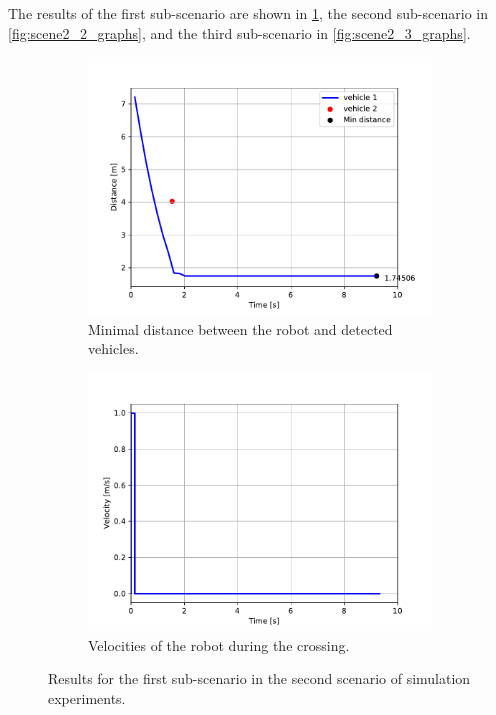             The results of the first sub-scenario are shown in \ref{fig:scene2_1_graphs}, the second sub-scenario in \ref{fig:scene2_2_graphs}, and the third sub-scenario in \ref{fig:scene2_3_graphs}.
            \begin{figure}[H]
                \centering
                \begin{subfigure}{0.49\linewidth}
                    \centering
                    \includegraphics[trim={24 8 35 41}, clip, width=\linewidth]{images/simulations/scene2_1_dist.pdf}
                    \caption{Minimal distance between the robot and detected vehicles.}
                \end{subfigure}
                \begin{subfigure}{0.49\linewidth}
                    \centering
                    \includegraphics[trim={21 8 40 41}, clip, width=\linewidth]{images/simulations/scene2_1_vel.pdf}
                    \caption{Velocities of the robot during the crossing.}
                \end{subfigure}
                \caption{Results for the first sub-scenario in the second scenario of simulation experiments.}
                \label{fig:scene2_1_graphs}
            \end{figure}

